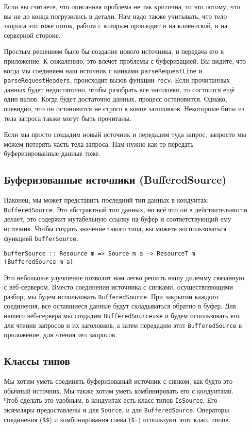 \begin{remark}
Если вы считаете, что описанная проблема не так критична, то это потому, что вы не до
 конца погрузились в детали. Нам надо также учитывать, что тело запроса это тоже поток,
работа с которым произодит и на клиентской, и на серверной стороне.
\end{remark}

Простым решением было бы создание нового источника, и передача его в приложение.
К сожалению, это влечет проблемы с буферизацией. Вы видите, что когда мы соединяем 
наш источник с кинками \lstinline'parseRequestLine' и \lstinline'parseRequestHeaders',
происходит вызов функции \lstinline'recv'.
Если прочитанных данных будет недостаточно, чтобы разобрать все заголовки, то 
состоится ещё один вызов. Когда будет достаточно данных, процесс остановится. 
Однако, очевидно, что он остановится не строго в конце заголовков. Некотороые 
биты из тела запроса также могут быть прочитаны.

Если мы просто создадим новый источник и передадим туда запрос, запросто мы можем 
потерять часть тела запроса. Нам нужно как-то передать буферизированные данные 
тоже.

\subsection{Буферизованные источники (BufferedSource)}
Наконец, мы может представить последний тип данных в кондуитах: 
\lstinline'BufferedSource'. Это абстрактный тип данных, но всё что он в 
действительности делает, это содержит мутабельную ссылку на буфер и 
соответствующий ему источник. Чтобы создать значение такого типа, вы можете 
воспользоваться функцией \lstinline'bufferSource'.
\begin{verbatim}
bufferSource :: Resource m => Source m a -> ResourceT m (BufferedSource m a)
\end{verbatim}
Это небольшое улучшение позволит нам легко решить нашу дилемму связанную с 
веб-сервером. Вместо соединения источника с синками, осуществляющими разбор, 
мы будем использовать \lstinline'BufferedSource'. При закрытии каждого 
соединения, все оставшиеся данные будут складываться обратно в буфер. 
Для нашего веб-сервера мы создадим \lstinline'BufferedSourceuse' и будем 
использовать его для чтения запросов и их заголовков, а затем передадим этот 
\lstinline'BufferedSource' в приложение, для чтения тел запросов.

\subsection{Классы типов}
Мы хотим уметь соединять буферизованый источник с синком, как будто это обычный источник.
Мы также хотим уметь комбинировать его с кондуитами. Чтоб сделать это удобным, в кондуитах
есть класс типов \lstinline'IsSource'. Его экземляры предоставлены и для
\lstinline'Source', и для \lstinline'BufferedSource'. 
Операторы соединения (\verb#$$#) и комбинирования слева (\verb#$=#) используют этот класс типов.

